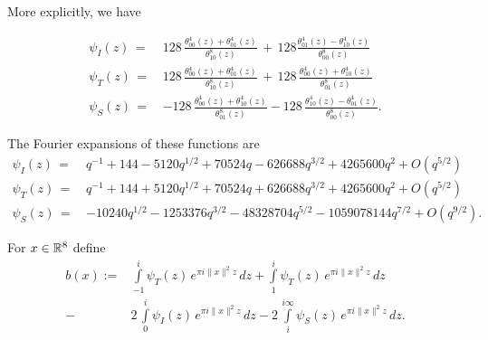 More explicitly, we have
\begin{lemma}\label{lemma: psi I psi T psi S explicit}
\begin{align}
\psi_I(z)\,=\,&128\,\frac{\theta_{00}^4(z)+\theta_{01}^4(z)}{\theta_{10}^8(z)}\,+\,128
              \frac{\theta_{01}^4(z)-\theta_{10}^4(z)}{\theta_{00}^8(z)}\label{eqn: psi I explicit}\\
\psi_T(z)\,=\,&128\,\frac{\theta_{00}^4(z)+\theta_{01}^4(z)}{\theta_{10}^8(z)}\,+
              \,128\,\frac{\theta_{00}^4(z)+\theta_{10}^4(z)}{\theta_{01}^8(z)}\label{eqn: psi T explicit}\\
\psi_S(z)\,=\,&-128\,\frac{\theta_{00}^4(z)+\theta_{10}^4(z)}{\theta_{01}^8(z)}-128\,
              \frac{\theta_{10}^4(z)-\theta_{01}^4(z)}{\theta_{00}^8(z)}.\label{eqn: psi S explicit}
\end{align}
\end{lemma}
\begin{lemma}\label{lemma: psi fourier I psi fourier T psi fourier S}
The Fourier expansions of these functions are
\begin{align}
  \psi_I(z)\,=\,&q^{-1} + 144 - 5120 q^{1/2} + 70524 q - 626688 q^{3/2} + 4265600 q^2  + O(q^{5/2}) \label{eqn: psi fourier I}\\
  \psi_T(z)\,=\,&q^{-1} + 144 + 5120 q^{1/2} + 70524 q + 626688 q^{3/2} + 4265600 q^2  + O(q^{5/2}) \label{eqn: psi fourier T}\\
  \psi_S(z)\,=\,&-10240 q^{1/2} - 1253376 q^{3/2} - 48328704 q^{5/2} - 1059078144 q^{7/2}+O(q^{9/2}).\label{eqn: psi fourier S}
\end{align}
\end{lemma}
\begin{definition}\label{def: b(r) definition}
For $x\in\mathbb{R}^8$ define
\begin{align}\label{eqn: b(r) definition}
  b(x):= & \int\limits_{-1}^{i}\psi_T(z)\,e^{\pi i \|x\|^2 z}\,dz
    + \int\limits_{1}^{i}\psi_T(z)\,e^{\pi i \|x\|^2 z}\,dz \\
  -& 2\,\int\limits_{0}^{i}\psi_I(z)\,e^{\pi i \|x\|^2 z}\,dz
  - 2\,\int\limits_{i}^{i\infty}\psi_S(z)\,e^{\pi i \|x\|^2 z}\,dz \nonumber.
\end{align}
\end{definition}
